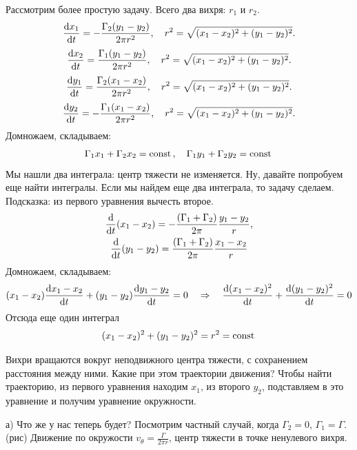 Рассмотрим более простую задачу. Всего два вихря: $r_1$ и $r_2$.
\begin{equation}
	\dv{x_1}{t}=-\frac{\Gamma_2 (y_1-y_2)}{2\pi r^2}, \quad r^2=\sqrt{(x_1-x_2)^2+(y_1-y_2)^2}.
\end{equation}
\begin{equation}
	\dv{x_2}{t}=\frac{\Gamma_1 (y_1-y_2)}{2\pi r^2}, \quad r^2=\sqrt{(x_1-x_2)^2+(y_1-y_2)^2}.
\end{equation}
\begin{equation}
	\dv{y_1}{t}=\frac{\Gamma_2 (x_1-x_2)}{2\pi r^2}, \quad r^2=\sqrt{(x_1-x_2)^2+(y_1-y_2)^2}.
\end{equation}
\begin{equation}
	\dv{y_2}{t}=-\frac{\Gamma_1 (x_1-x_2)}{2\pi r^2}, \quad r^2=\sqrt{(x_1-x_2)^2+(y_1-y_2)^2}.
\end{equation}
Домножаем, складываем:
\begin{equation}
	\Gamma_1 x_1 + \Gamma_2 x_2=\mathrm{const}\,, \quad
	\Gamma_1 y_1 + \Gamma_2 y_2=\mathrm{const}\,
\end{equation}
Мы нашли два интеграла: центр тяжести не изменяется.
Ну, давайте попробуем еще найти интегралы. Если мы найдем еще два интеграла, то задачу сделаем. Подсказка: из первого уравнения вычесть второе.
\begin{gather}
	\dv{t}\qty(x_1-x_2)=-\frac{\qty(\Gamma_1+ \Gamma_2)}{2\pi}\frac{y_1-y_2}{r},\\
	\dv{t}\qty(y_1-y_2)=\frac{\qty(\Gamma_1+ \Gamma_2)}{2\pi}\frac{x_1-x_2}{r}
\end{gather}
Домножаем, складываем:
\begin{equation}
	(x_1-x_2)\dv{x_1-x_2}{t}+(y_1-y_2)\dv{y_1-y_2}{t}=0 \quad \Rightarrow \quad
	\dv{(x_1-x_2)^2}{t}+\dv{(y_1-y_2)^2}{t}=0
\end{equation}
Отсюда еще один интеграл
\begin{equation}
	(x_1-x_2)^2+(y_1-y_2)^2=r^2=\mathrm{const}\,	
\end{equation}

Вихри вращаются вокруг неподвижного центра тяжести, с сохранением расстояния между ними. Какие при этом траектории движения? Чтобы найти траекторию, из первого уравнения находим $x_1$, из второго $y_2$, подставляем в это уравнение и получим уравнение окружности.

а) Что же у нас теперь будет? Посмотрим частный случай, когда $\Gamma_2=0$, $\Gamma_1=\Gamma$. (рис) Движение по окружости $v_\theta=\frac{\Gamma}{2\pi r}$, центр тяжести в точке ненулевого вихря.

